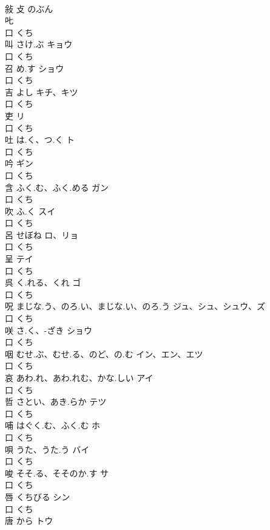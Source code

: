 \documentclass[8pt]{extreport}
\begin{document}
\begin{CJK}{UTF8}{min}
\\	敍	攴		のぶん		
\\	𠮟				
\\	口		くち		
\\	叫	さけ.ぶ	キョウ	
\\	口		くち		
\\	召	め.す	ショウ	
\\	口		くち		
\\	吉	よし	キチ、キツ	
\\	口		くち		
\\	吏		リ	
\\	口		くち		
\\	吐	は.く、つ.く	ト	
\\	口		くち		
\\	吟		ギン	
\\	口		くち		
\\	含	ふく.む、ふく.める	ガン	
\\	口		くち		
\\	吹	ふ.く	スイ	
\\	口		くち		
\\	呂	せぼね	ロ、リョ	
\\	口		くち		
\\	呈		テイ	
\\	口		くち		
\\	呉	く.れる、くれ	ゴ	
\\	口		くち		
\\	呪	まじな.う、のろ.い、まじな.い、のろ.う	ジュ、シュ、シュウ、ズ	
\\	口		くち		
\\	咲	さ.く、-ざき	ショウ	
\\	口		くち		
\\	咽	むせ.ぶ、むせ.る、のど、の.む	イン、エン、エツ	
\\	口		くち		
\\	哀	あわ.れ、あわ.れむ、かな.しい	アイ	
\\	口		くち		
\\	哲	さとい、あき.らか	テツ	
\\	口		くち		
\\	哺	はぐく.む、ふく.む	ホ	
\\	口		くち		
\\	唄	うた、うた.う	バイ	
\\	口		くち		
\\	唆	そそ.る、そそのか.す	サ	
\\	口		くち		
\\	唇	くちびる	シン	
\\	口		くち		
\\	唐	から	トウ	

\end{CJK}
\end{document}
